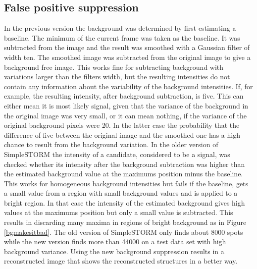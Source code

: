 \subsection{False positive suppression}
In the previous version the background was determined by first estimating a baseline. The minimum of the current frame was taken as the baseline. It was subtracted from the image and the result was smoothed with a Gaussian filter of width ten. The smoothed image was subtracted from the original image to give a background free image. This works fine for subtracting background with variations larger than the filters width, but the resulting intensities do not contain any information about the variability of the background intensities.\newline
If, for example, the resulting intensity, after background subtraction, is five. This can either mean it is most likely signal, given that the variance of the background in the original image was very small, or it can mean nothing, if the variance of the original background pixels were 20. In the latter case the probability that the difference of five between the original image and the smoothed one has a high chance to result from the background variation.\newline
In the older version of SimpleSTORM the intensity of a candidate, considered to be a signal, was checked 
whether its intensity after the background subtraction was higher than the estimated background value at the maximums position minus the baseline. This works for homogeneous background intensities but fails if the baseline, gets a small value from a region with small background values and is applied to a bright region. In that case the intensity of the estimated background gives high values at the maximums position but only a small value is subtracted. This results in discarding many maxima in regions of bright background as in Figure \ref{bgmakesitbad}.
The old version of SimpleSTORM only finds about 8000 spots while the new version finds more than 44000 on a test data set with high background variance. Using the new background suppression results in a reconstructed image that shows the reconstructed structures in a better way.

